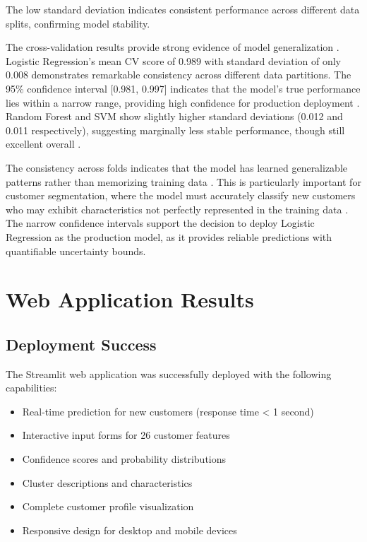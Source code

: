 \documentclass[12pt,a4paper]{report}
\begin{document}
\noindent The low standard deviation indicates consistent performance across different data splits, confirming model stability.

\noindent The cross-validation results provide strong evidence of model generalization \cite{hastie2009}. Logistic Regression's mean CV score of 0.989 with standard deviation of only 0.008 demonstrates remarkable consistency across different data partitions. The 95\% confidence interval [0.981, 0.997] indicates that the model's true performance lies within a narrow range, providing high confidence for production deployment \cite{kohavi2009}. Random Forest and SVM show slightly higher standard deviations (0.012 and 0.011 respectively), suggesting marginally less stable performance, though still excellent overall \cite{breiman2001, vapnik1995}.


\noindent The consistency across folds indicates that the model has learned generalizable patterns rather than memorizing training data \cite{hastie2009}. This is particularly important for customer segmentation, where the model must accurately classify new customers who may exhibit characteristics not perfectly represented in the training data \cite{kumar2006}. The narrow confidence intervals support the decision to deploy Logistic Regression as the production model, as it provides reliable predictions with quantifiable uncertainty bounds.


\section{Web Application Results}

\subsection{Deployment Success}
\noindent The Streamlit web application was successfully deployed with the following capabilities:

\begin{itemize}
    \item Real-time prediction for new customers (response time < 1 second)
    \item Interactive input forms for 26 customer features
    \item Confidence scores and probability distributions
    \item Cluster descriptions and characteristics
    \item Complete customer profile visualization
    \item Responsive design for desktop and mobile devices
\end{itemize}
\end{document}

